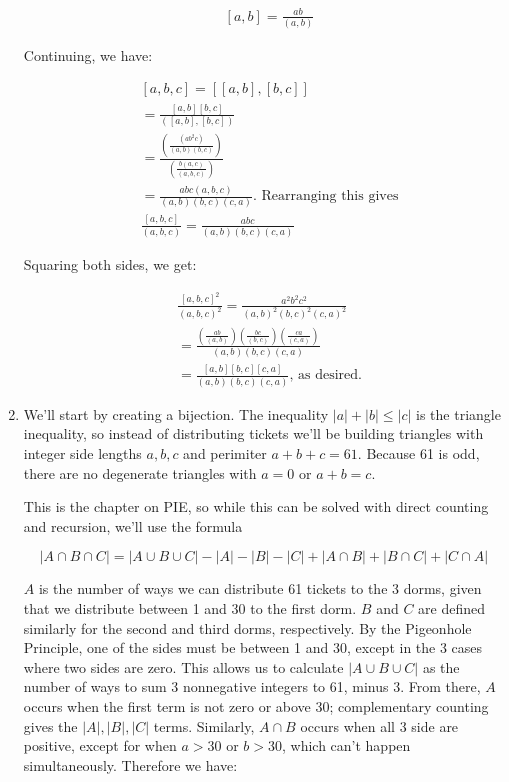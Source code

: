 \documentclass{book}
\numberwithin{equation}{section}
\begin{document}
\begin{enumerate}[label={6.\arabic*}]
\begin{align*}
& [a, b] = \frac{ab}{(a, b)}
\end{align*}

Continuing, we have:

\begin{align*}
& [a, b, c] = [[a, b], [b, c]] \\
& = \frac{[a, b][b, c]}{([a, b], [b, c])} \\
& = \frac{ \left( \frac{(ab^2c)}{(a, b)(b, c)}\right) }{\left( \frac{b(a, c)}{(a, b, c)} \right)} \\
& = \frac{a b c (a, b, c)}{(a, b)(b, c)(c, a)} \text{. Rearranging this gives} \\
& \frac{[a, b, c]}{(a, b, c)} = \frac{abc}{(a, b)(b, c)(c, a)}
\end{align*}

Squaring both sides, we get:

\begin{align*}
& \frac{[a, b, c]^2}{(a, b, c)^2} = \frac{a^2 b^2 c^2}{(a, b)^2 (b, c)^2 (c, a)^2} \\
& = \frac{\left( \frac{ab}{(a, b)} \right) \left( \frac{bc}{(b, c)} \right) \left( \frac{ca}{(c, a)} \right) }{(a, b)(b, c)(c, a)}\\
& = \frac{[a, b][b, c][c, a]}{(a, b)(b, c)(c, a)} \text{, as desired.}
\end{align*}

\item
We'll start by creating a bijection. The inequality $|a| + |b| \leq |c|$ is the triangle inequality, so instead of distributing
tickets we'll be building triangles with integer side lengths $a, b, c$ and perimiter $a+b+c = 61$. Because 61 is odd,
there are no degenerate triangles with $a=0$ or $a + b = c$.

This is the chapter on PIE, so while this can be solved with direct counting and recursion, we'll use the formula

$$|A \cap B \cap C| = |A \cup B \cup C| - |A| - |B| - |C| + |A \cap B| + |B \cap C| + |C \cap A|$$

$A$ is the number of ways we can distribute 61 tickets to the 3 dorms, given that we distribute between 1 and 30
to the first dorm. $B$ and $C$ are defined similarly for the second and third dorms, respectively. By the Pigeonhole
Principle, one of the sides must be between 1 and 30, except in the 3 cases where two sides are zero. This allows us
to calculate $|A \cup B \cup C|$ as the number of ways to sum 3 nonnegative integers to 61, minus 3. From there,
$A$ occurs when the first term is not zero or above 30; complementary counting gives the $|A|, |B|, |C|$ terms.
Similarly, $A \cap B$ occurs when all 3 side are positive, except for when $a > 30$ or $b > 30$, which
can't happen simultaneously. Therefore we have:


\end{enumerate}
\end{document}
